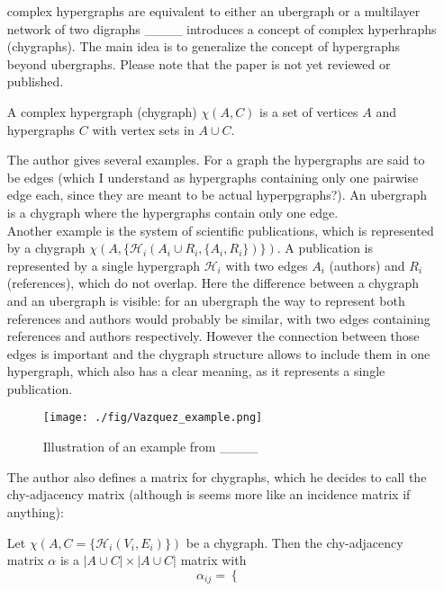 \begin{itemize}
\item [complex hypergraphs are equivalent to either an ubergraph or a multilayer network of two digraphs] ____ introduces a concept of complex hyperhraphs (chygraphs). The main idea is to generalize the concept of hypergraphs beyond ubergraphs. Please note that the paper is not yet reviewed or published.
\begin{definition}
    A complex hypergraph (chygraph) $\chi(A,C)$ is a set of vertices $A$ and hypergraphs $C$ with vertex sets in $A \cup C$.
\end{definition}
The author gives several examples. For a graph the hypergraphs are said to be edges (which I understand as hypergraphs containing only one pairwise edge each, since they are meant to be actual hyperpgraphs?).
An ubergraph is a chygraph where the hypergraphs contain only one edge. \\
Another example is the system of scientific publications, which is represented by a chygraph $\chi(A, \{ \mathcal{H}_i(A_i \cup R_i, \{A_i, R_i\})\}) $. A publication is represented by a single hypergraph $\mathcal{H}_i$ with two edges $A_i$ (authors) and $R_i$ (references), which do not overlap. Here the difference between a chygraph and an ubergraph is visible: for an ubergraph the way to represent both references and authors would probably be similar, with two edges containing references and authors respectively. However the connection between those edges is important and the chygraph structure allows to include them in one hypergraph, which also has a clear meaning, as it represents a single publication. \\
\begin{figure}[h!]
	\begin{center}
        \texttt{[image: ./fig/Vazquez\_example.png]}
        \caption{Illustration of an example from ____} 
    	\label{Vazquez_example}
    \end{center}
    \end{figure}
The author also defines a matrix for chygraphs, which he decides to call the chy-adjacency matrix (although is seems more like an incidence matrix if anything):
\begin{definition}
    Let $\chi(A, C=\{ \mathcal{H}_i(V_i, E_i)\})$ be a chygraph. Then the chy-adjacency matrix $\alpha$ is a  $|A\cup C| \times |A \cup C|$ matrix with 
    \begin{equation*}
        \alpha_{ij}=\begin{cases}

\end{cases}
\end{equation*}
\end{definition}
\end{itemize}
